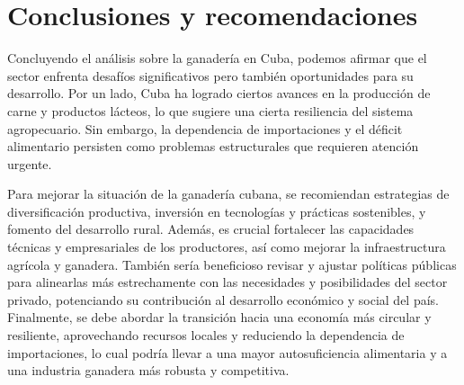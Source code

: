 \documentclass{article}
\begin{document}
\section{Conclusiones y recomendaciones}
Concluyendo el análisis sobre la ganadería en Cuba, podemos afirmar que el sector enfrenta desafíos significativos pero también oportunidades para su desarrollo. Por un lado, Cuba ha logrado ciertos avances en la producción de carne y productos lácteos, lo que sugiere una cierta 
resiliencia del sistema agropecuario. Sin embargo, la dependencia de importaciones y el déficit alimentario persisten como problemas estructurales que requieren atención urgente.

Para mejorar la situación de la ganadería cubana, se recomiendan estrategias de diversificación productiva, inversión en tecnologías y prácticas sostenibles, y fomento del desarrollo rural. Además, es crucial fortalecer las capacidades técnicas y empresariales de los productores, 
así como mejorar la infraestructura agrícola y ganadera. También sería beneficioso revisar y ajustar políticas públicas para alinearlas más estrechamente con las necesidades y posibilidades del sector privado, potenciando su contribución al desarrollo económico y social del país. 
Finalmente, se debe abordar la transición hacia una economía más circular y resiliente, aprovechando recursos locales y reduciendo la dependencia de importaciones, lo cual podría llevar a una mayor autosuficiencia alimentaria y a una industria ganadera más robusta y competitiva.
\end{document}
